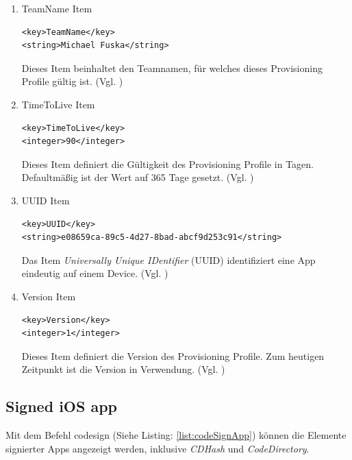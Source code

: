 \begin{enumerate}
    \item TeamName Item
\begin{lstlisting}[captionpos=b, caption={TeamName Item}]
<key>TeamName</key>
<string>Michael Fuska</string>
\end{lstlisting}
 Dieses Item beinhaltet den Teamnamen, für welches dieses Provisioning Profile gültig ist. (Vgl. \cite{iOSSec[5], Hacking[1]})

   \item TimeToLive Item
\begin{lstlisting}[captionpos=b, caption={TimeToLive Item}]
<key>TimeToLive</key>
<integer>90</integer>
\end{lstlisting}
Dieses Item definiert die Gültigkeit des Provisioning Profile in Tagen. Defaultmäßig ist der Wert auf 365 Tage gesetzt. (Vgl. \cite{iOSSec[5], Hacking[1]})
 
    \item UUID Item
\begin{lstlisting}[captionpos=b, caption={UUID Item}]
<key>UUID</key>
<string>e08659ca-89c5-4d27-8bad-abcf9d253c91</string>
\end{lstlisting}
Das Item \textit{\glqq Universally Unique IDentifier\grqq{}} (UUID) identifiziert eine App eindeutig auf einem Device. (Vgl. \cite{iOSSec[5], Hacking[1]})

    \item Version Item
\begin{lstlisting}[captionpos=b, caption={Version Item}]
<key>Version</key>
<integer>1</integer> 
\end{lstlisting}
Dieses Item definiert die Version des Provisioning Profile. Zum heutigen Zeitpunkt ist die Version \textit{\grqq{}} in Verwendung. (Vgl. \cite{iOSSec[5], Hacking[1]})
\end{enumerate}

\subsection{Signed iOS app}
\label{sec:SignediOSApp}
Mit dem Befehl \glqq codesign\grqq{} (Siehe Listing: \ref{list:codeSignApp}) können die Elemente signierter Apps angezeigt werden, inklusive \textit{\glqq CDHash\grqq{}} und \textit{\glqq CodeDirectory\grqq}.
\newline

